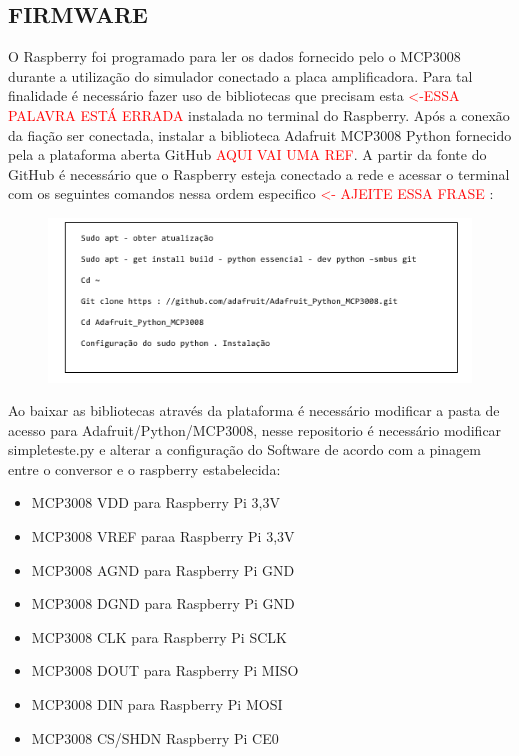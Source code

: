 \documentclass[12pt, a4paper]{article}
\begin{document}
\subsection{FIRMWARE}
\hspace*{0.8cm}O Raspberry foi programado para ler os dados fornecido pelo o MCP3008 durante a utilização do simulador conectado a placa amplificadora. Para tal finalidade é necessário fazer uso de bibliotecas que precisam esta \textcolor{red}{<-ESSA PALAVRA ESTÁ ERRADA} instalada no terminal do Raspberry. Após a conexão  da fiação ser conectada, instalar a biblioteca Adafruit MCP3008 Python fornecido pela a plataforma aberta GitHub \textcolor{red}{AQUI VAI UMA REF}. A partir da fonte do GitHub é necessário que o Raspberry esteja conectado a rede e acessar o terminal com os seguintes comandos nessa ordem especifico \textcolor{red}{<- AJEITE ESSA FRASE} :
\begin{figure}[H]
\begin{center}
		
			\includegraphics[width=.8\textwidth]{Figuras/com.PNG}
			
\end{center}
\end{figure}

Ao baixar as bibliotecas através da plataforma é necessário modificar a pasta de acesso para Adafruit/Python/MCP3008, nesse repositorio é necessário modificar simpleteste.py e alterar a configuração do Software de acordo com a pinagem entre o conversor e o raspberry estabelecida:
\begin{itemize}
\item MCP3008 VDD para Raspberry Pi 3,3V
\item MCP3008 VREF paraa Raspberry Pi 3,3V
\item MCP3008 AGND para Raspberry Pi GND
\item MCP3008 DGND para Raspberry Pi GND
\item MCP3008 CLK para Raspberry Pi SCLK
\item MCP3008 DOUT para Raspberry Pi MISO 
\item MCP3008 DIN para Raspberry Pi MOSI
\item MCP3008 CS/SHDN Raspberry Pi CE0
\end{itemize}
\end{document}
